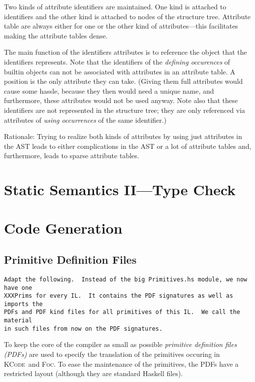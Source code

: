 \documentclass{report}
\newcommand{\FOC}{\textsc{Foc}}
\newcommand{\KCode}{\textsc{KCode}}
\begin{document}
Two kinds of attribute identifiers are maintained. One kind is attached to
identifiers and the other kind is attached to nodes of the structure
tree. Attribute table are always either for one or the other kind of
attributes---this facilitates making the attribute tables dense.

The main function of the identifiers attributes is to reference the object
that the identifiers represents.  Note that the identifiers of the
\emph{defining occurences} of builtin objects can not be associated with
attributes in an attribute table.  A position is the only attribute they can
take.  (Giving them full attributes would cause some hassle, because they then
would need a unique name, and furthermore, these attributes would not be used
anyway.  Note also that these identifiers are not represented in the structure
tree; they are only referenced via attributes of \emph{using occurrences} of
the same identifier.)

Rationale: Trying to realize both kinds of attributes by using just attributes
in the AST leads to either complications in the AST or a lot of attribute
tables and, furthermore, leads to sparse attribute tables.

\chapter{Static Semantics II---Type Check}
\label{cha:static2}


\chapter{Code Generation}
\label{cha:codegen}

\section{Primitive Definition Files}
\label{sec:pdf}

\begin{verbatim}
Adapt the following.  Instead of the big Primitives.hs module, we now have one
XXXPrims for every IL.  It contains the PDF signatures as well as imports the
PDFs and PDF kind files for all primitives of this IL.  We call the material
in such files from now on the PDF signatures.
\end{verbatim}

To keep the core of the compiler as small as possible \emph{primitive
  definition files (PDFs)} are used to specify the translation of the
primitives occuring in \KCode\ and \FOC.  To ease the maintenance of the
primitives, the PDFs have a restricted layout (although they are standard
Haskell files).
\end{document}
